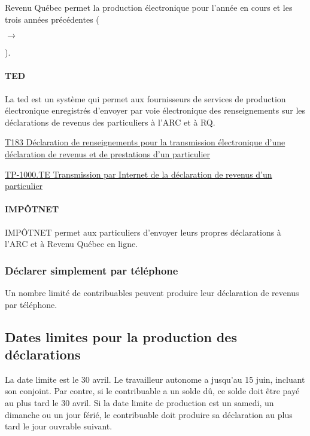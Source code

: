 \setcounter{annee}{2023}
Revenu Québec permet la production électronique pour l'année en cours et les trois années précédentes (\addtocounter{annee}{-3}\theannee{} $\rightarrow$ \addtocounter{annee}{3}\theannee{}).

\paragraph{TED}
La \acrshort{ted} est un système qui permet aux fournisseurs de services de production électronique enregistrés d'envoyer par voie électronique des renseignements sur les déclarations de revenus des particuliers à l'ARC et à RQ.

\cat\href{https://www.canada.ca/fr/agence-revenu/services/formulaires-publications/formulaires/t183.html}{T183 Déclaration de renseignements pour la transmission électronique d'une déclaration de revenus et de prestations d'un particulier}

\qct\href{https://www.revenuquebec.ca/fr/services-en-ligne/formulaires-et-publications/details-courant/tp-1000-te/}{TP-1000.TE Transmission par Internet de la déclaration de revenus d'un particulier}

\paragraph{IMPÔTNET}
IMPÔTNET permet aux particuliers d'envoyer leurs propres déclarations à l'ARC  et à Revenu Québec en ligne.

\subsubsection{Déclarer simplement par téléphone}
Un nombre limité de contribuables peuvent produire leur déclaration de revenus par téléphone.


\subsection{Dates limites pour la production des déclarations}
La date limite est le 30 avril. Le travailleur autonome a jusqu'au 15 juin, incluant son conjoint. Par contre, si le contribuable a un solde dû, ce solde doit être payé au plus tard le 30 avril. Si la date limite de production est un samedi, un dimanche ou un jour férié, le contribuable doit produire sa déclaration au plus tard le jour ouvrable suivant.

